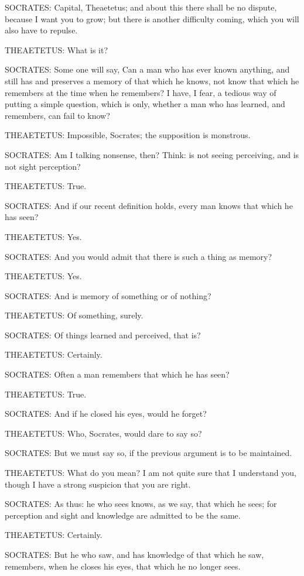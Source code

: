 SOCRATES: Capital, Theaetetus; and about this there shall be no dispute,
because I want you to grow; but there is another difficulty coming,
which you will also have to repulse.

THEAETETUS: What is it?

SOCRATES: Some one will say, Can a man who has ever known anything, and
still has and preserves a memory of that which he knows, not know that
which he remembers at the time when he remembers? I have, I fear, a
tedious way of putting a simple question, which is only, whether a man
who has learned, and remembers, can fail to know?

THEAETETUS: Impossible, Socrates; the supposition is monstrous.

SOCRATES: Am I talking nonsense, then? Think: is not seeing perceiving,
and is not sight perception?

THEAETETUS: True.

SOCRATES: And if our recent definition holds, every man knows that which
he has seen?

THEAETETUS: Yes.

SOCRATES: And you would admit that there is such a thing as memory?

THEAETETUS: Yes.

SOCRATES: And is memory of something or of nothing?

THEAETETUS: Of something, surely.

SOCRATES: Of things learned and perceived, that is?

THEAETETUS: Certainly.

SOCRATES: Often a man remembers that which he has seen?

THEAETETUS: True.

SOCRATES: And if he closed his eyes, would he forget?

THEAETETUS: Who, Socrates, would dare to say so?

SOCRATES: But we must say so, if the previous argument is to be
maintained.

THEAETETUS: What do you mean? I am not quite sure that I understand you,
though I have a strong suspicion that you are right.

SOCRATES: As thus: he who sees knows, as we say, that which he sees; for
perception and sight and knowledge are admitted to be the same.

THEAETETUS: Certainly.

SOCRATES: But he who saw, and has knowledge of that which he saw,
remembers, when he closes his eyes, that which he no longer sees.

